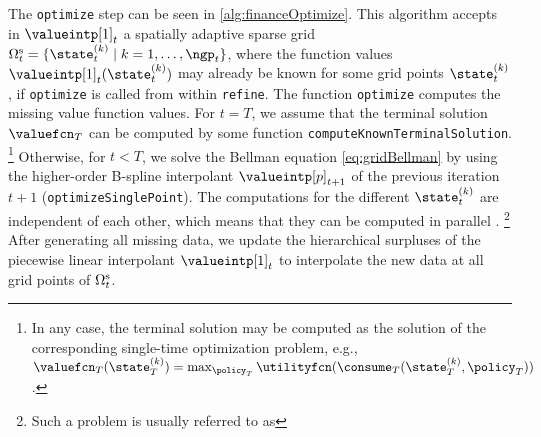 The \texttt{optimize} step can be seen in \cref{alg:financeOptimize}.
This algorithm accepts in $\valueintp[1]_t$
a spatially adaptive sparse grid
$\gridset{t}{\sparse}
= \{\state_t^{(k)} \mid k = 1, \dotsc, \ngp_t\}$,
where the function values $\valueintp[1]_t(\state_t^{(k)})$
may already be known for some grid points $\state_t^{(k)}$,
if \texttt{optimize} is called from within \texttt{refine}.
The function \texttt{optimize} computes the missing value function values.
For $t = T$, we assume that the terminal solution
$\valuefcn_T$ can be computed by some function
\texttt{computeKnownTerminalSolution}.%
\footnote{%
  In any case, the terminal solution may be computed as the
  solution of the corresponding single-time optimization problem,
  e.g., $\valuefcn_T(\state_T^{(k)})
  = \max_{\policy_T} \utilityfcn(\consume_T(\state_T^{(k)}, \policy_T))$.%
}
Otherwise, for $t < T$, we solve the Bellman equation
\eqref{eq:gridBellman} by using the higher-order B-spline interpolant
$\valueintp[p]_{t+1}$ of the previous iteration $t + 1$
(\texttt{optimizeSinglePoint}).
The computations for the different $\state_t^{(k)}$ are
independent of each other,
which means that they can be computed in parallel \cite{Horneff16Efficient}.%
\footnote{%
  Such a problem is usually referred to as %
}
After generating all missing data,
we update the hierarchical surpluses of the
piecewise linear interpolant $\valueintp[1]_t$
to interpolate the new data at all grid points of $\gridset{t}{\sparse}$.

